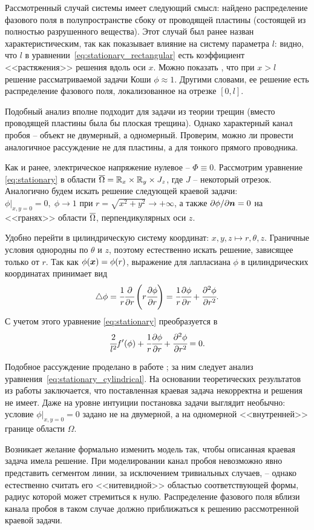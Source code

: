 Рассмотренный случай системы имеет следующий смысл: найдено распределение фазового поля в полупространстве сбоку от проводящей пластины (состоящей из полностью разрушенного вещества). Этот случай был ранее назван характеристическим, так как показывает влияние на систему параметра $l$: видно, что $l$ в уравнении~\eqref{eq:stationary_rectangular} есть коэффициент <<растяжения>> решения вдоль оси $x$. Можно показать \cite{zipunova_higher_codimension}, что при $x > l$ решение рассматриваемой задачи Коши $\phi \approx 1$. Другими словами, ее решение есть распределение фазового поля, локализованное на отрезке $[0, l]$.

Подобный анализ вполне подходит для задачи из теории трещин (вместо проводящей пластины была бы плоская трещина). Однако характерный канал пробоя -- объект не двумерный, а одномерный. Проверим, можно ли провести аналогичное рассуждение не для пластины, а для тонкого прямого проводника.

Как и ранее, электрическое напряжение нулевое -- $\Phi \equiv 0$. Рассмотрим уравнение \eqref{eq:stationary} в области ${\overline{\Omega}} = {\mathbb{R}}_x \times {\mathbb{R}}_y \times J_z$, где $J$ -- некоторый отрезок. Аналогично будем искать решение следующей краевой задачи: $\phi|_{x, y = 0} = 0, \; \phi \to 1$ при $r = \sqrt{x^2 + y^2} \to +\infty$, а также $\partial \phi / \partial {\boldsymbol{n}} = 0$ на <<гранях>> области ${\overline{\Omega}}$, перпендикулярных оси $z$.

Удобно перейти в цилиндрическую систему координат: $x, y, z \mapsto r, \theta, z$. Граничные условия однородны по $\theta$ и $z$, поэтому естественно искать решение, зависящее только от $r$. Так как $\phi({\boldsymbol{x}}) = \phi(r)$, выражение для лапласиана $\phi$ в цилиндрических координатах принимает вид
$$\triangle \phi = \cfrac{1}{r} \cfrac{\partial}{\partial r} \left( r \cfrac{\partial \phi}{\partial r} \right) = \cfrac{1}{r} \cfrac{\partial \phi}{\partial r} + \cfrac{\partial ^2 \phi}{\partial r^2} {\text{.}}$$
С учетом этого уравнение \eqref{eq:stationary} преобразуется в
\begin{equation}
    \cfrac{2}{l^2} f'(\phi) + \cfrac{1}{r} \cfrac{\partial \phi}{\partial r} + \cfrac{\partial ^2 \phi}{\partial r^2} = 0 {\text{.}}
    \label{eq:stationary_cylindrical}
\end{equation}

Подобное рассуждение проделано в работе \cite{zipunova_higher_codimension}; за ним следует анализ уравнения~\eqref{eq:stationary_cylindrical}. На основании теоретических результатов из работы \cite{cirstea_elliptic_equations} заключается, что поставленная краевая задача некорректна и решения не имеет. Даже на уровне интуиции постановка задачи выглядит необычно: условие $\phi|_{x, y = 0} = 0$ задано не на двумерной, а на одномерной <<внутренней>> границе области $\Omega$.

Возникает желание формально изменить модель так, чтобы описанная краевая задача имела решение. При моделировании канал пробоя невозможно явно представить сегментом линии, за исключением тривиальных случаев, -- однако естественно считать его <<нитевидной>> областью соответствующей формы, радиус которой может стремиться к нулю. Распределение фазового поля вблизи канала пробоя в таком случае должно приближаться к решению рассмотренной краевой задачи.